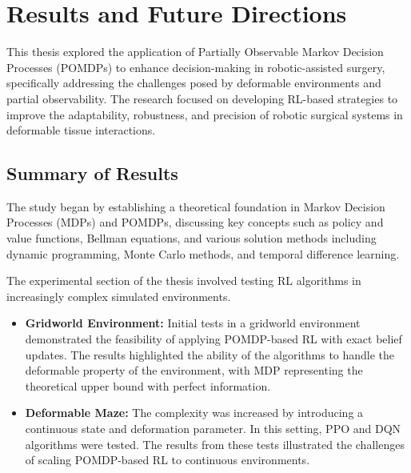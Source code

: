 
\chapter{Results and Future Directions}





This thesis explored the application of Partially Observable Markov Decision Processes (POMDPs) to enhance decision-making in robotic-assisted surgery, specifically addressing the challenges posed by deformable environments and partial observability. The research focused on developing RL-based strategies to improve the adaptability, robustness, and precision of robotic surgical systems in deformable tissue interactions.

\section{Summary of Results}

The study began by establishing a theoretical foundation in Markov Decision Processes (MDPs) and POMDPs, discussing key concepts such as policy and value functions, Bellman equations, and various solution methods including dynamic programming, Monte Carlo methods, and temporal difference learning.

The experimental section of the thesis involved testing RL algorithms in increasingly complex simulated environments.

\begin{itemize}
    \item \textbf{Gridworld Environment:} Initial tests in a gridworld environment demonstrated the feasibility of applying POMDP-based RL with exact belief updates. The results highlighted the ability of the algorithms to handle the deformable property of the environment, with MDP representing the theoretical upper bound with perfect information.
    \item \textbf{Deformable Maze:} The complexity was increased by introducing a continuous state and deformation parameter. In this setting, PPO and DQN algorithms were tested. The results from these tests illustrated the challenges of scaling POMDP-based RL to continuous environments.
\end{itemize}

